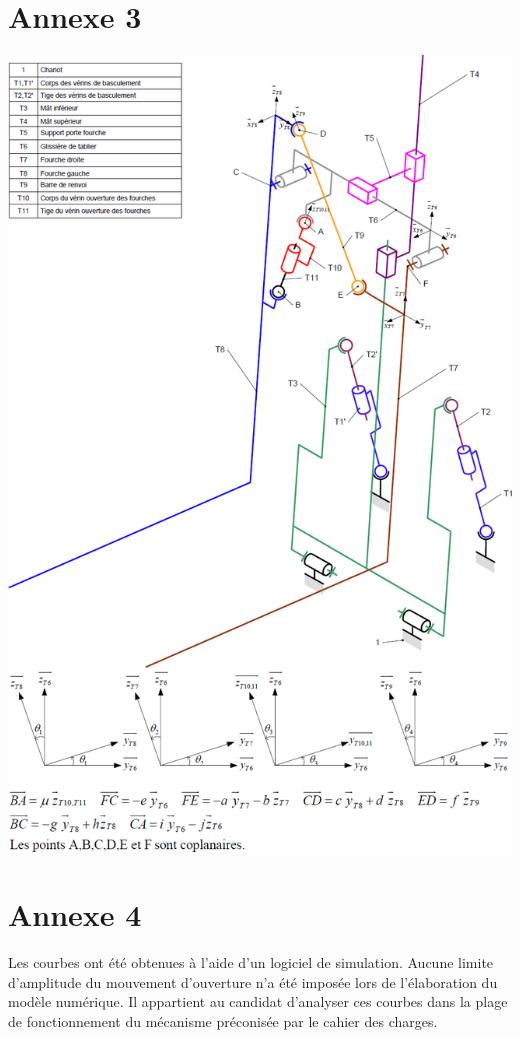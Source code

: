 \documentclass[10pt,fleqn]{article} %
\begin{document}
\newpage
\section*{Annexe 3}

\begin{center}
\includegraphics[width=.9\linewidth]{images/ann_03}
\end{center}



\newpage
\section*{Annexe 4}
Les courbes ont été obtenues à l’aide d’un logiciel de simulation. Aucune limite d’amplitude du mouvement d’ouverture n’a été imposée lors de l’élaboration du modèle numérique. Il appartient au candidat d’analyser ces courbes dans la plage de fonctionnement du mécanisme préconisée par le cahier des charges.
\end{document}
